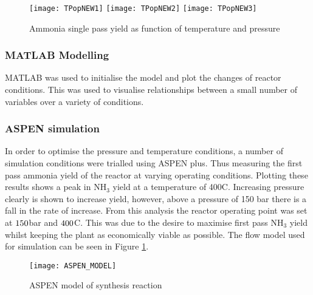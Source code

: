 {\begin{figure}[!htbp]
			\texttt{[image: TPopNEW1]}	
			\texttt{[image: TPopNEW2]}	
			\texttt{[image: TPopNEW3]}
			\caption{Ammonia single pass yield as function of temperature and pressure}	
\end{figure}}

\subsubsection{MATLAB Modelling}
MATLAB was used to initialise the model and plot the changes of reactor conditions. This was used to visualise relationships between a small number of variables over a variety of conditions.
\subsubsection{ASPEN simulation}
In order to optimise the pressure and temperature conditions, a number of simulation conditions were trialled using ASPEN plus. Thus measuring the first pass ammonia yield of the reactor at varying operating conditions. Plotting these results shows a peak in NH$_3$ yield at a temperature of 400\textdegree C. Increasing pressure clearly is shown to increase yield, however, above a pressure of 150 bar there is a fall in the rate of increase. From this analysis the reactor operating point was set at $150$bar and $400$\textdegree C. This was due to the desire to maximise first pass NH$_3$ yield whilst keeping the plant as economically viable as possible. The flow model used for simulation can be seen in Figure \ref{fig:aspenF}.



%    
%

{\centering
	\begin{figure}[!htbp]
		\texttt{[image: ASPEN\_MODEL]}
		\caption{ASPEN model of synthesis reaction 	\label{fig:aspenF}}
\end{figure}}
